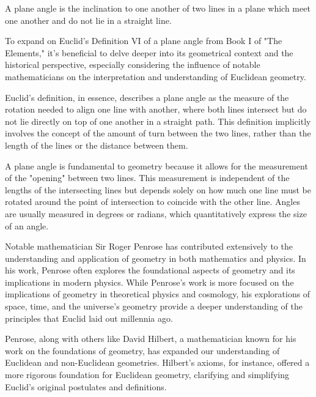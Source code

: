 
\begin{defin}
A plane angle is the inclination to one another of two lines in a plane which meet one another and do not lie in a straight line.
\end{defin}

To expand on Euclid's Definition VI of a plane angle from Book I of "The Elements," it's beneficial to delve deeper into its geometrical context and the historical perspective, especially considering the influence of notable mathematicians on the interpretation and understanding of Euclidean geometry.

Euclid's definition, in essence, describes a plane angle as the measure of the rotation needed to align one line with another, where both lines intersect but do not lie directly on top of one another in a straight path. This definition implicitly involves the concept of the amount of turn between the two lines, rather than the length of the lines or the distance between them.

A plane angle is fundamental to geometry because it allows for the measurement of the "opening" between two lines. This measurement is independent of the lengths of the intersecting lines but depends solely on how much one line must be rotated around the point of intersection to coincide with the other line. Angles are usually measured in degrees or radians, which quantitatively express the size of an angle.

Notable mathematician Sir Roger Penrose has contributed extensively to the understanding and application of geometry in both mathematics and physics. In his work, Penrose often explores the foundational aspects of geometry and its implications in modern physics. While Penrose's work is more focused on the implications of geometry in theoretical physics and cosmology, his explorations of space, time, and the universe's geometry provide a deeper understanding of the principles that Euclid laid out millennia ago.

\clearpage

Penrose, along with others like David Hilbert, a mathematician known for his work on the foundations of geometry, has expanded our understanding of Euclidean and non-Euclidean geometries. Hilbert's axioms, for instance, offered a more rigorous foundation for Euclidean geometry, clarifying and simplifying Euclid's original postulates and definitions.


